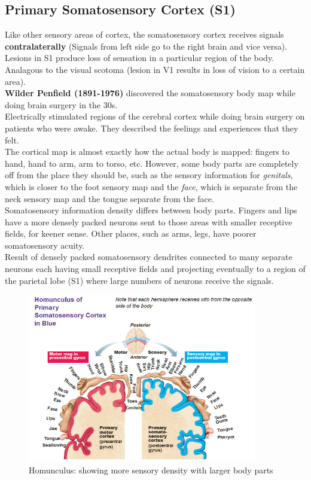 \documentclass{article}
\begin{document}
\subsection{Primary Somatosensory Cortex (S1)}

Like other sensory areas of cortex, the somatosensory cortex receives signals\textbf{ contralaterally} (Signals from left side go to the right brain and vice versa). \\

Lesions in S1 produce loss of sensation in a particular region of the body. Analagous to the visual scotoma (lesion in V1 results in loss of vision to a certain area). \\

\noindent \textbf{Wilder Penfield (1891-1976)} discovered the somatosensory body map while doing brain surgery in the 30s. \\
Electrically stimulated regions of the cerebral cortex while doing brain surgery on patients who were awake. They described the feelings and experiences that they felt. \\

The cortical map is almost exactly how the actual body is mapped: fingers to hand, hand to arm, arm to torso, etc. However, some body parts are completely off from the place they should be, such as the sensory information for \textit{genitals}, which is closer to the foot sensory map and the \textit{face}, which is separate from the neck sensory map and the tongue separate from the face. \\

Somatosensory information density differs between body parts. Fingers and lips have a more densely packed neurons sent to those areas with smaller receptive fields, for keener sense. Other places, such as arms, legs, have poorer somatosensory acuity. \\
Result of densely packed somatosensory dendrites connected to many separate neurons each having small receptive fields and projecting eventually to a region of the parietal lobe (S1) where large numbers of neurons receive the signals. \\

\begin{figure}[htp]
\centering
\includegraphics[width=10cm]{images/homunculus.jpg}
\caption{Homunculus: showing more sensory density with larger body parts}
\label{fig: Homunculus}
\end{figure}
\end{document}
